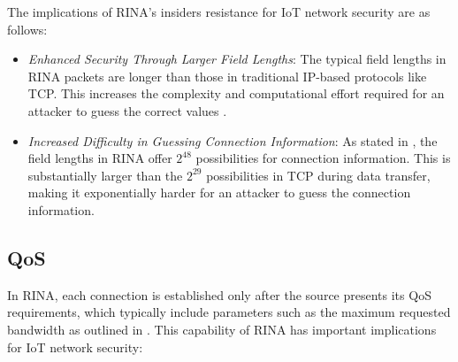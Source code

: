 \documentclass{ieeeaccess}
\begin{document}
The implications of RINA's insiders resistance for IoT network security are as follows:

\begin{itemize}
	\item \textit{Enhanced Security Through Larger Field Lengths}: The typical field lengths in RINA packets are longer than those in traditional IP-based protocols like TCP. This increases the complexity and computational effort required for an attacker to guess the correct values \cite{small2012}.
	\item \textit{Increased Difficulty in Guessing Connection Information}: As stated in \cite{boddapati2012assessing}, the field lengths in RINA offer $2^{48}$ possibilities for connection information. This is substantially larger than the $2^{29}$ possibilities in TCP during data transfer, making it exponentially harder for an attacker to guess the connection information.
\end{itemize}

\subsection{QoS}
In RINA, each connection is established only after the source presents its QoS requirements, which typically include parameters such as the maximum requested bandwidth as outlined in \cite{gaixas2016assuring}. This capability of RINA has important implications for IoT network security:
\end{document}
